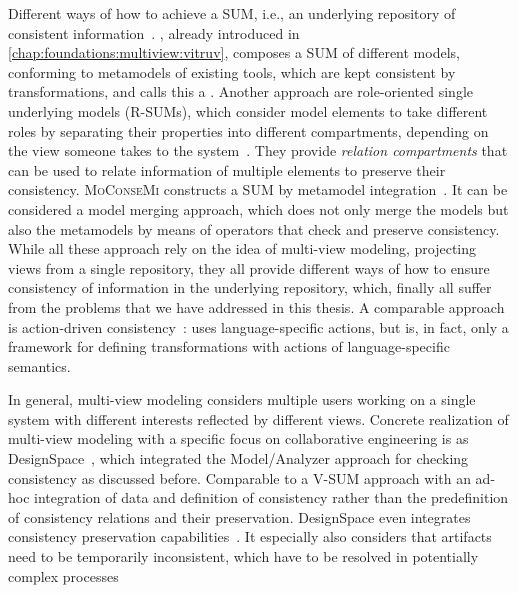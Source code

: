 Different ways of how to achieve a \gls{SUM}, i.e., an underlying repository of consistent information~.
\vitruv, already introduced in \autoref{chap:foundations:multiview:vitruv}, composes a \gls{SUM} of different models, conforming to metamodels of existing tools, which are kept consistent by transformations, and calls this a \vsum.
Another approach are role-oriented single underlying models (R-SUMs), which consider model elements to take different roles by separating their properties into different compartments, depending on the view someone takes to the system~\cite{werner2018rsum-SEAA, werner2018rsum-MRT}.
They provide \emph{relation compartments} that can be used to relate information of multiple elements to preserve their consistency.
\textsc{MoConseMi} constructs a \gls{SUM} by metamodel integration~\cite{meier2019MoConseMi-Models}.
It can be considered a model merging approach, which does not only merge the models but also the metamodels by means of operators that check and preserve consistency.
While all these approach rely on the idea of multi-view modeling, projecting views from a single repository, they all provide different ways of how to ensure consistency of information in the underlying repository, which, finally all suffer from the problems that we have addressed in this thesis.
A comparable approach is action-driven consistency~\cite{ali2020ActionDrivenConsistency-SAM}: uses language-specific actions, but is, in fact, only a framework for defining transformations with actions of language-specific semantics.

In general, multi-view modeling considers multiple users working on a single system with different interests reflected by different views.
Concrete realization of multi-view modeling with a specific focus on collaborative engineering is as DesignSpace~\cite{demuth2015designSpace-SAC,egyed2019consistencyArtifacts-Computer}, which integrated the Model/Analyzer approach for checking consistency as discussed before.
Comparable to a V-SUM approach with an ad-hoc integration of data and definition of consistency rather than the predefinition of consistency relations and their preservation.
DesignSpace even integrates consistency preservation capabilities~\cite{troels2019liveconsistency-SAC, khelladi2019sideeffects-SLE}.
It especially also considers that artifacts need to be temporarily inconsistent, which have to be resolved in potentially complex processes~\cite{kretschmer2020ConsistentChangePropagation-SoSym}

